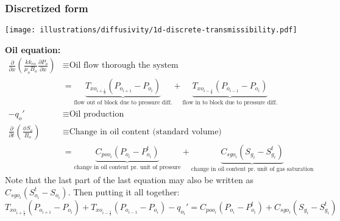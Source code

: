 \subsubsection{Discretized form} %
\label{ssub:discretized_form}
\begin{center}
  \texttt{[image: illustrations/diffusivity/1d-discrete-transmissibility.pdf]}
\end{center}
\textbf{Oil equation:}
\begin{align}
  \frac{\partial}{\partial x}\left(\frac{kk_{ro}}{\mu_{o}B_{o}}\frac{\partial P_{o}}{\partial x}\right)
  &\equiv \text{Oil flow thorough the system} \nonumber \\
  &= \underset{\text{flow out of block due to pressure diff.}}{\underbrace{T_{xo_{i+\frac{1}{2}}}\left(P_{o_{i+1}}-P_{o_{i}}\right)}}+\underset{\text{flow  in to block due to pressure diff.}}{\underbrace{T_{xo_{i-\frac{1}{2}}}\left(P_{o_{i-1}}-P_{o_{i}}\right)}} \nonumber \\
  -q_o' &\equiv \text{Oil production} \nonumber \\
  \frac{\partial}{\partial t}\left(\frac{\phi S_{o}}{B_{o}}\right)
  &\equiv \text {Change in oil content (standard volume)} \nonumber \\
  &= \underset{\text{change in oil content pr. unit of pressure}}{\underbrace{C_{poo_{i}}\left(P_{o_{i}}-P_{o_{i}}^{t}\right)}}
  +\underset{\text{change in oil content pr. unit of gas saturation}}{\underbrace{C_{sgo_{i}}\left(S_{g_{i}}-S_{g_{i}}^{t}\right)}} \nonumber
\end{align}
Note that the last part of the last equation may also be written as $C_{sgo_{i}}\left(S_{o_{i}}^{t}-S_{o_{i}}\right)$. Then putting it all together:
\begin{equation}
  T_{xo_{i+\frac{1}{2}}}\left(P_{o_{i+1}}-P_{o_{i}}\right)
  + T_{xo_{i-\frac{1}{2}}}\left(P_{o_{i-1}}-P_{o_{i}}\right)
  - q_{o_i}'
  = C_{poo_{i}}\left(P_{o_{i}}-P_{o_{i}}^{t}\right)
  + C_{sgo_{i}}\left(S_{g_{i}}-S_{g_{i}}^{t}\right)
\end{equation}

